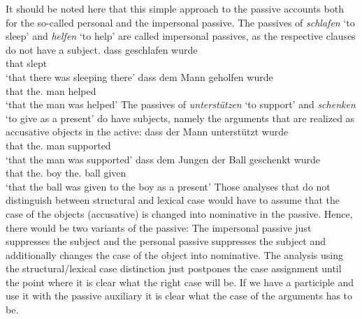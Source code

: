 \largerpage
It should be noted here that this simple approach to the passive accounts both for the so-called
personal and the impersonal passive. The passives of \emph{schlafen} `to sleep' and \emph{helfen}
`to help' are called impersonal passives, as the respective clauses do not have a subject. 
\eal
\ex 
\gll dass geschlafen wurde\\
     that slept      \AUX\\\german
\glt `that there was sleeping there'
\ex
\gll dass dem Mann geholfen wurde\\
     that the.\DAT{} man helped \AUX\\
\glt `that the man was helped'
\zl
The passives of \emph{unterstützen} `to support' and \emph{schenken} `to give as a present' do have
subjects, namely the arguments that are realized as accusative objects in the active:
\eal
\ex 
\gll dass der Mann unterstützt wurde\\
     that the.\NOM{} man supported \AUX\\\german
\glt `that the man was supported'
\ex
\gll dass dem Jungen der Ball geschenkt wurde\\
     that the.\DAT{} boy the.\NOM{} ball given \AUX\\
\glt `that the ball was given to the boy as a present'
\zl
Those analyses that do not distinguish between structural and lexical case would have to assume that the case of the objects
(accusative) is changed into nominative in the passive. Hence, there would be two variants of the
passive: The impersonal passive just suppresses the subject and the personal passive suppresses the
subject and additionally changes the case of the object into nominative. The analysis using the
structural/lexical case distinction just postpones the case assignment until the point where it is
clear what the right case will be. If we have a participle and use it with the passive auxiliary it
is clear what the case of the arguments has to be.





